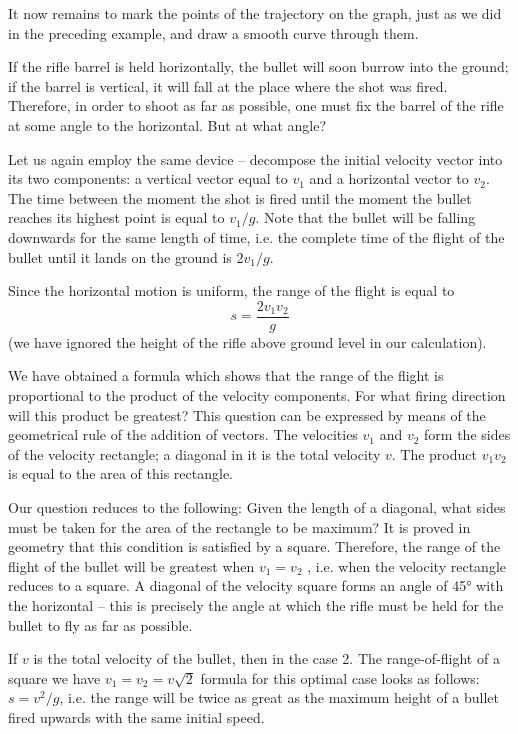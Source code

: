 It now remains to mark the points of the trajectory on
the graph, just as we did in the preceding example, and
draw a smooth curve through them.

If the rifle barrel is held horizontally, the bullet will
soon burrow into the ground; if the barrel is vertical, it
will fall at the place where the shot was fired. Therefore,
in order to shoot as far as possible, one must fix the barrel
of the rifle at some angle to the horizontal. But at what
angle?

Let us again employ the same device -- decompose the
initial velocity vector into its two components: a vertical
vector equal to $v_{1}$ and a horizontal vector to $v_{2}$. The
time between the moment the shot is fired until the moment
the bullet reaches its highest point is equal to $v_{1}/ g$. Note
that the bullet will be falling downwards for the same
length of time, i.e. the complete time of the flight of the
bullet until it lands on the ground is $2v_{1}/g$.

Since the horizontal motion is uniform, the range of the flight is equal to 
\begin{equation*}
s = \frac{2v_{1}v_{2}}{g} 
\end{equation*}
(we have ignored the height of the rifle above ground level
in our calculation).

We have obtained a formula which shows that the range
of the flight is proportional to the product of the velocity
components. For what firing direction will this product
be greatest? This question can be expressed by means of
the geometrical rule of the addition of vectors. The velocities $v_{1}$ and $v_{2}$ form the sides of the velocity rectangle; a diagonal in it is the total velocity $v$. The product $v_{1}v_{2}$ is equal to the area of this rectangle.

Our question reduces to the following: Given the length
of a diagonal, what sides must be taken for the area of
the rectangle to be maximum? It is proved in geometry
that this condition is satisfied by a square. Therefore, the
range of the flight of the bullet will be greatest when
$v_{1} = v_{2}$ , i.e. when the velocity rectangle reduces to a
square. A diagonal of the velocity square forms an angle
of \ang{45} with the horizontal -- this is precisely the angle
at which the rifle must be held for the bullet to fly as far
as possible.

If $v$ is the total velocity of the bullet, then in the case 2. The range-of-flight of a square we have $v_{1} = v_{2} =v\sqrt{2}$
formula for this optimal case looks as follows: $s = v^{2}/g$,
i.e. the range will be twice as great as the maximum height
of a bullet fired upwards with the same initial speed.

